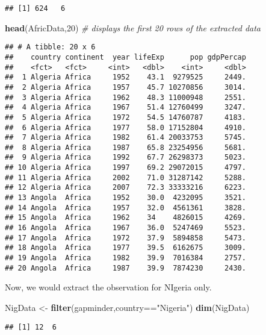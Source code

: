 \documentclass[]{article}
\newenvironment{Shaded}{\begin{snugshade}}{\end{snugshade}}
\newcommand{\KeywordTok}[1]{\textcolor[rgb]{0.13,0.29,0.53}{\textbf{{#1}}}}
\newcommand{\DecValTok}[1]{\textcolor[rgb]{0.00,0.00,0.81}{{#1}}}
\newcommand{\StringTok}[1]{\textcolor[rgb]{0.31,0.60,0.02}{{#1}}}
\newcommand{\CommentTok}[1]{\textcolor[rgb]{0.56,0.35,0.01}{\textit{{#1}}}}
\newcommand{\NormalTok}[1]{{#1}}
\begin{document}
\begin{verbatim}
## [1] 624   6
\end{verbatim}

\begin{Shaded}
\begin{Highlighting}[]
\KeywordTok{head}\NormalTok{(AfricData,}\DecValTok{20}\NormalTok{)  }\CommentTok{# displays the first 20 rows of the extracted data}
\end{Highlighting}
\end{Shaded}

\begin{verbatim}
## # A tibble: 20 x 6
##    country continent  year lifeExp      pop gdpPercap
##    <fct>   <fct>     <int>   <dbl>    <int>     <dbl>
##  1 Algeria Africa     1952    43.1  9279525     2449.
##  2 Algeria Africa     1957    45.7 10270856     3014.
##  3 Algeria Africa     1962    48.3 11000948     2551.
##  4 Algeria Africa     1967    51.4 12760499     3247.
##  5 Algeria Africa     1972    54.5 14760787     4183.
##  6 Algeria Africa     1977    58.0 17152804     4910.
##  7 Algeria Africa     1982    61.4 20033753     5745.
##  8 Algeria Africa     1987    65.8 23254956     5681.
##  9 Algeria Africa     1992    67.7 26298373     5023.
## 10 Algeria Africa     1997    69.2 29072015     4797.
## 11 Algeria Africa     2002    71.0 31287142     5288.
## 12 Algeria Africa     2007    72.3 33333216     6223.
## 13 Angola  Africa     1952    30.0  4232095     3521.
## 14 Angola  Africa     1957    32.0  4561361     3828.
## 15 Angola  Africa     1962    34    4826015     4269.
## 16 Angola  Africa     1967    36.0  5247469     5523.
## 17 Angola  Africa     1972    37.9  5894858     5473.
## 18 Angola  Africa     1977    39.5  6162675     3009.
## 19 Angola  Africa     1982    39.9  7016384     2757.
## 20 Angola  Africa     1987    39.9  7874230     2430.
\end{verbatim}

Now, we would extract the observation for NIgeria only.

\begin{Shaded}
\begin{Highlighting}[]
\NormalTok{NigData <-}\StringTok{ }\KeywordTok{filter}\NormalTok{(gapminder,country==}\StringTok{"Nigeria"}\NormalTok{)}
\KeywordTok{dim}\NormalTok{(NigData)}
\end{Highlighting}
\end{Shaded}

\begin{verbatim}
## [1] 12  6
\end{verbatim}
\end{document}
